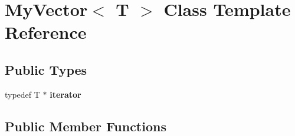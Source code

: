 \hypertarget{class_my_vector}{}\section{My\+Vector$<$ T $>$ Class Template Reference}
\label{class_my_vector}
\subsection*{Public Types}
\begin{DoxyCompactItemize}
\item 
\mbox{\label{class_my_vector_acba9914bf2ef1d10a036bcd5dd1aef63}} 
typedef T $\ast$ {\bfseries iterator}
\end{DoxyCompactItemize}
\subsection*{Public Member Functions}
